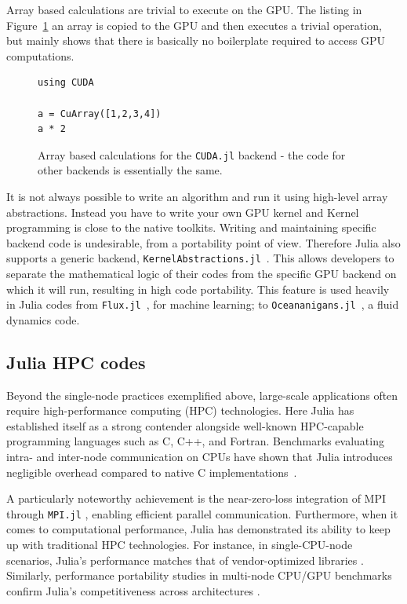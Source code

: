 \documentclass{webofc}
\begin{document}
Array based calculations are trivial to execute on the GPU. The listing in
Figure~\ref{code:arraysgpu} an array is copied to the GPU and then executes a
trivial operation, but mainly shows that there is basically no boilerplate required to access GPU computations. 

\begin{figure}[!ht]
\begin{center}
\begin{verbatim}
using CUDA

a = CuArray([1,2,3,4])
a * 2
\end{verbatim}
\caption{Array based calculations for the \texttt{CUDA.jl} backend - the code for other backends is essentially the same.}
\label{code:arraysgpu}
\end{center}
\end{figure}

It is not always possible to write an algorithm and run it using high-level
array abstractions. Instead you have to write your own GPU kernel and Kernel
programming is close to the native toolkits.  Writing and maintaining specific
backend code is undesirable, from a portability point of view. Therefore Julia
also supports a generic backend,
\texttt{KernelAbstractions.jl}~\cite{BESARD201929,8471188}. This allows
developers to separate the mathematical logic of their codes from the specific
GPU backend on which it will run, resulting in high code portability. This
feature is used heavily in Julia codes from \texttt{Flux.jl}~\cite{innes:2018},
for machine learning; to
\texttt{Oceananigans.jl}~\cite{Ramadhan_Oceananigans_jl_Fast_and_2020}, a fluid
dynamics code.

\subsection{Julia HPC codes}
\label{sec:julia-hpc}
Beyond the single-node practices exemplified above, large-scale applications
often require high-performance computing (HPC) technologies. Here Julia has
established itself as a strong contender alongside well-known HPC-capable
programming languages such as C, C++, and Fortran. Benchmarks evaluating intra-
and inter-node communication on CPUs have shown that Julia introduces negligible
overhead compared to native C implementations~\cite{hunold2020benchmarking}. 

A particularly noteworthy achievement is the near-zero-loss integration of MPI
through \texttt{MPI.jl} \cite{byrne2021mpi}, enabling efficient parallel
communication. Furthermore, when it comes to computational performance, Julia
has demonstrated its ability to keep up with traditional HPC technologies. For
instance, in single-CPU-node scenarios, Julia's performance matches that of
vendor-optimized libraries \cite{giordano2022productivity}. Similarly,
performance portability studies in multi-node CPU/GPU benchmarks confirm Julia's
competitiveness across architectures
\cite{teichgraber2022julia,godoy2023evaluating}.
\end{document}
